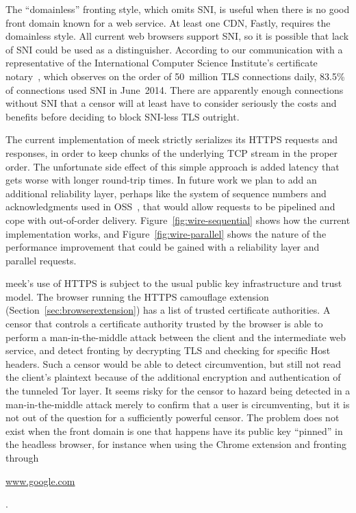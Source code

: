 \documentclass{sig-alternate}
\newcommand{\meek}{meek\xspace}
\def\urll#1{\begin{NoHyper}\url{#1}\end{NoHyper}}
\begin{document}
The ``domainless'' fronting style, which omits SNI,
is useful when there is no good front domain known for a web service.
At least one CDN, Fastly, requires the domainless style.
All current web browsers support SNI,
so it is possible that lack of SNI could be used as a distinguisher.
According to our communication with
a representative of
the International Computer Science Institute's
certificate notary~\cite{icsi-notary},
which observes on the order of 50~million TLS connections daily,
83.5\% of connections used SNI in June~2014.
There are apparently enough connections without SNI
that a censor will at least have to consider seriously
the costs and benefits before deciding to block SNI-less TLS outright.

The current implementation of \meek strictly serializes
its HTTPS requests and responses,
in order to keep chunks of the underlying TCP stream
in the proper order.
The unfortunate side effect of this simple approach
is added latency that gets worse with longer round-trip times.
In future work we plan to add an additional reliability layer,
perhaps like the system of sequence numbers and acknowledgments used in OSS~\cite{oss},
that would allow requests to be pipelined
and cope with out-of-order delivery.
Figure~\ref{fig:wire-sequential} shows how the current implementation works,
and Figure~\ref{fig:wire-parallel} shows the nature of the performance
improvement that could be gained with a reliability layer
and parallel requests.

\meek's use of HTTPS is subject to the usual public key infrastructure
and trust model.
The browser running the HTTPS camouflage extension (Section~\ref{sec:browserextension})
has a list of trusted certificate authorities.
A censor that controls a certificate authority trusted by the browser
is able to perform a man-in-the-middle attack
between the client and the intermediate web service,
and detect fronting by decrypting TLS and checking for specific Host headers.
Such a censor would be able to detect circumvention,
but still not read the client's plaintext because of the
additional encryption and authentication of the tunneled Tor layer.
It seems risky for the censor to hazard being detected in
a man-in-the-middle attack merely to confirm that a user is circumventing,
but it is not out of the question for a sufficiently powerful censor.
The problem does not exist when the front domain is one
that happens have its public key ``pinned'' in the headless browser,
for instance when using the Chrome extension and fronting through
\urll{www.google.com}.
\end{document}
